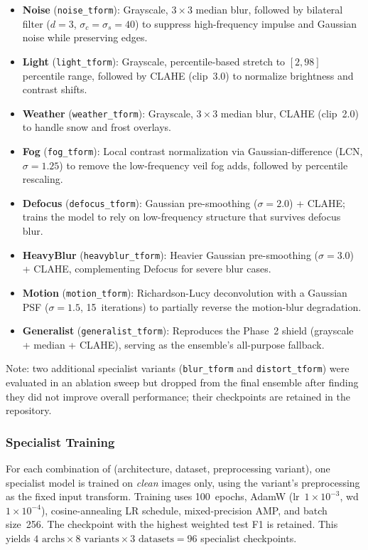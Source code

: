 \documentclass[conference]{IEEEtran}
\begin{document}
\begin{itemize}
    \item \textbf{Noise} (\texttt{noise\_tform}): Grayscale, $3{\times}3$ median blur, followed by bilateral filter ($d{=}3$, $\sigma_{c}{=}\sigma_{s}{=}40$) to suppress high-frequency impulse and Gaussian noise while preserving edges.
    \item \textbf{Light} (\texttt{light\_tform}): Grayscale, percentile-based stretch to $[2,98]$ percentile range, followed by CLAHE (clip~3.0) to normalize brightness and contrast shifts.
    \item \textbf{Weather} (\texttt{weather\_tform}): Grayscale, $3{\times}3$ median blur, CLAHE (clip~2.0) to handle snow and frost overlays.
    \item \textbf{Fog} (\texttt{fog\_tform}): Local contrast normalization via Gaussian-difference (LCN, $\sigma{=}1.25$) to remove the low-frequency veil fog adds, followed by percentile rescaling.
    \item \textbf{Defocus} (\texttt{defocus\_tform}): Gaussian pre-smoothing ($\sigma{=}2.0$) + CLAHE; trains the model to rely on low-frequency structure that survives defocus blur.
    \item \textbf{HeavyBlur} (\texttt{heavyblur\_tform}): Heavier Gaussian pre-smoothing ($\sigma{=}3.0$) + CLAHE, complementing Defocus for severe blur cases.
    \item \textbf{Motion} (\texttt{motion\_tform}): Richardson-Lucy deconvolution with a Gaussian PSF ($\sigma{=}1.5$, 15~iterations) to partially reverse the motion-blur degradation.
    \item \textbf{Generalist} (\texttt{generalist\_tform}): Reproduces the Phase~2 shield (grayscale + median + CLAHE), serving as the ensemble's all-purpose fallback.
\end{itemize}

Note: two additional specialist variants (\texttt{blur\_tform} and \texttt{distort\_tform}) were evaluated in an ablation sweep but dropped from the final ensemble after finding they did not improve overall performance; their checkpoints are retained in the repository.

\subsubsection{Specialist Training}
For each combination of (architecture, dataset, preprocessing variant), one specialist model is trained on \emph{clean} images only, using the variant's preprocessing as the fixed input transform. Training uses 100~epochs, AdamW (lr~$1{\times}10^{-3}$, wd~$1{\times}10^{-4}$), cosine-annealing LR schedule, mixed-precision AMP, and batch size~256. The checkpoint with the highest weighted test F1 is retained. This yields $4 \text{ archs} \times 8 \text{ variants} \times 3 \text{ datasets} = 96$ specialist checkpoints.
\end{document}
